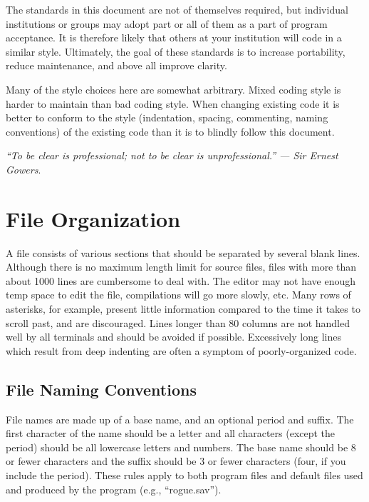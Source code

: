  The standards in this document are not of themselves required, but individual
institutions or groups may adopt part or all of them as a part of program
acceptance. It is therefore likely that others at your institution will code in
a similar style. Ultimately, the goal of these standards is to increase
portability, reduce maintenance, and above all improve clarity. 

 Many of the style choices here are somewhat arbitrary. Mixed coding style is
harder to maintain than bad coding style. When changing existing code it is
better to conform to the style (indentation, spacing, commenting, naming
conventions) of the existing code than it is to blindly follow this document. 

{\em ``To be clear is professional; not to be clear is unprofessional.'' ---
Sir Ernest  Gowers}.
\newpage
\section{File Organization}
 A file consists of various sections that should be separated by several blank
lines. Although there is no maximum length limit for source files, files with
more than about 1000 lines are cumbersome to deal with. The editor may not have
enough temp space to edit the file, compilations will go more slowly, etc. Many
rows of asterisks, for example, present little information compared to the time
it takes to scroll past, and are discouraged. Lines longer than 80 columns are
not handled well by all terminals and should be avoided if possible.
Excessively long lines which result from deep indenting are often a symptom of
poorly-organized code. 

\subsection{File Naming Conventions}

 File names are made up of a base name, and an optional period and suffix. The
first character of the name should be a letter and all characters (except the
period) should be all lowercase letters and numbers. The base name should be
8 or fewer characters and the suffix should be 3 or fewer characters (four, if
you include the period). These rules apply to both program files and default
files used and produced by the program (e.g., ``rogue.sav''). 

